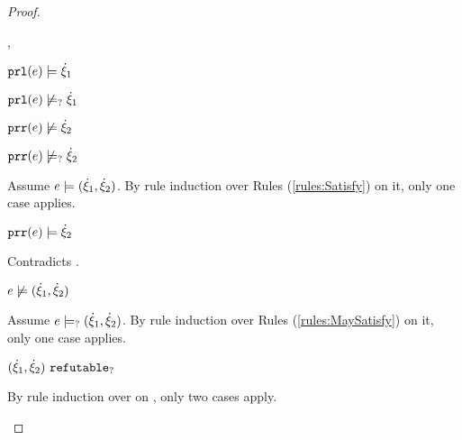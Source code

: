 \begin{proof}
\begin{byCases}
\begin{byCases}
\begin{byCases}
        \item[\csatisfy{\hprl{e}}{\hxi_1},\cnotsatisfyormay{\hprr{e}}{\hxi_2}]
            \begin{pfsteps*}
            \item $\mathtt{prl}(e) \models \dot{\xi}_1$  
            \item $\mathtt{prl}(e) \not\models_{?} \dot{\xi}_1$  
            \item $\mathtt{prr}(e) \not\models \dot{\xi}_2$  
            \item $\mathtt{prr}(e) \not\models_{?} \dot{\xi}_2$  
            \end{pfsteps*}
            Assume $e \models (\dot{\xi}_1 , \dot{\xi}_2)$. By rule induction over Rules (\ref{rules:Satisfy}) on it, only one case applies.
            \begin{byCases}
            \item[\text{(\ref{rule:CSNotIntroPair})}]
                \begin{pfsteps*}
                \item $\mathtt{prr}(e) \models \dot{\xi}_2$ 
                \end{pfsteps*}
                Contradicts .
            \end{byCases}
            \begin{pfsteps*}
            \item $e \not\models (\dot{\xi}_1 , \dot{\xi}_2)$  
            \end{pfsteps*}
            Assume $e \models_{?} (\dot{\xi}_1 , \dot{\xi}_2)$. By rule induction over Rules (\ref{rules:MaySatisfy}) on it, only one case applies.
            \begin{byCases}
            \item[\text{(\ref{rule:CMSNotIntro})}]
                \begin{pfsteps*}
                \item $(\dot{\xi}_1 , \dot{\xi}_2) ~\mathtt{refutable}_?$  
                \end{pfsteps*}
                By rule induction over  on , only two cases apply.
                \begin{byCases}
                \item[\text{(\ref{rule:RXPairL})}]

\end{byCases}
\end{byCases}
\end{byCases}
\end{byCases}
\end{byCases}
\end{proof}
